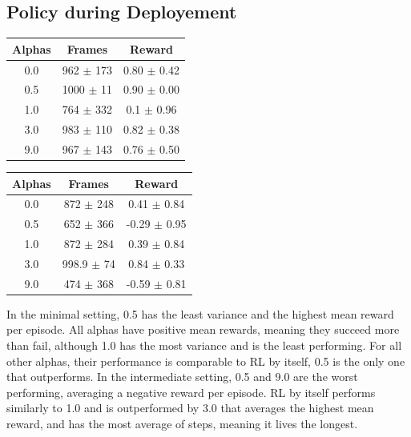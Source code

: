  \subsection{Policy during Deployement}

        \begin{minipage}{.5\textwidth}
            \centering
            \begin{tabular}{||c c c||} 
                \hline
                Alphas & Frames & Reward \\ [0.5ex] 
                \hline\hline
                0.0 & 962 $\pm$ 173 & 0.80 $\pm$ 0.42 \\ 
                \hline
                0.5 & 1000 $\pm$ 11 & 0.90 $\pm$ 0.00 \\
                \hline
                1.0 & 764 $\pm$ 332 & 0.1 $\pm$ 0.96 \\
                \hline
                3.0 & 983 $\pm$ 110 & 0.82 $\pm$ 0.38 \\
                \hline
                9.0 & 967 $\pm$ 143 & 0.76 $\pm$ 0.50 \\ [1ex] 
                \hline
               \end{tabular}
          \end{minipage} %
          \begin{minipage}{.5\textwidth}
              \centering
              \begin{tabular}{||c c c||} 
                \hline
                Alphas & Frames & Reward \\ [0.5ex] 
                \hline\hline
                0.0 & 872 $\pm$ 248 & 0.41 $\pm$ 0.84 \\ 
                \hline
                0.5 & 652 $\pm$ 366 & -0.29 $\pm$ 0.95 \\
                \hline
                1.0 & 872 $\pm$ 284 & 0.39 $\pm$ 0.84 \\
                \hline
                3.0 & 998.9 $\pm$ 74 & 0.84 $\pm$ 0.33 \\
                \hline
                9.0 & 474 $\pm$ 368 & -0.59 $\pm$ 0.81 \\ [1ex] 
                \hline
               \end{tabular}
          \end{minipage}

          In the minimal setting, 0.5 has the least variance and the highest mean reward per episode. All alphas have positive mean rewards, meaning they succeed more than fail, 
          although 1.0 has the most variance and is the least performing. For all other alphas, their performance is comparable to RL by itself, 0.5 is the only one that outperforms. 
          In the intermediate setting, 0.5 and 9.0 are the worst performing, averaging a negative reward per episode. RL by itself performs similarly to 1.0 and is outperformed by 3.0 that averages the highest mean reward, 
          and has the most average of steps, meaning it lives the longest. 

